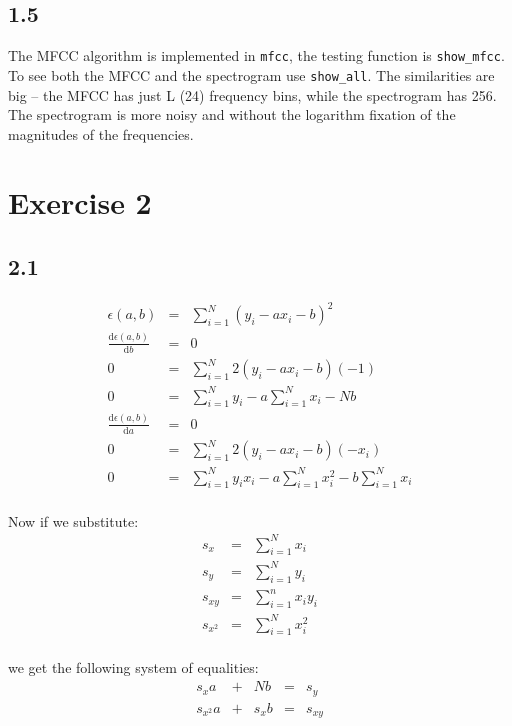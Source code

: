 \documentclass[a4paper]{article}
\def\d{\mathrm{d}}
\begin{document}
\subsection*{1.5}

The MFCC algorithm is implemented in \texttt{mfcc}, the testing function is
\texttt{show\_mfcc}. To see both the MFCC and the spectrogram use
\texttt{show\_all}. The similarities are big -- the MFCC has just L (24)
frequency bins, while the spectrogram has 256. The spectrogram is more noisy and
without the logarithm fixation of the magnitudes of the frequencies.

\section*{Exercise 2}

\subsection*{2.1}

\begin{eqnarray*}
\epsilon(a,b) &=& \sum_{i = 1}^{N} (y_i - ax_i - b)^2 \\
\frac{\d\epsilon(a, b)}{\d b} &=& 0 \\
0 &=& \sum_{i = 1}^{N} 2(y_i - ax_i - b)(-1) \\
0 &=& \sum_{i = 1}^{N} y_i - a\sum_{i = 1}^{N} x_i - Nb \\
\frac{\d\epsilon(a, b)}{\d a} &=& 0 \\
0 &=& \sum_{i = 1}^{N} 2(y_i - ax_i - b)(-x_i) \\
0 &=& \sum_{i = 1}^{N} y_ix_i - a\sum_{i = 1}^{N} x_i^2 - b\sum_{i=1}^{N} x_i \\
\end{eqnarray*}

Now if we substitute:
\begin{eqnarray*}
s_x &=& \sum_{i = 1}^{N} x_i \\
s_y &=& \sum_{i = 1}^{N} y_i \\
s_{xy} &=& \sum_{i = 1}^{n} x_iy_i \\
s_{x^2} &=& \sum_{i = 1}^{N} x_i^2 \\
\end{eqnarray*}

we get the following system of equalities:
\[
\begin{array}{|ccccc}
  s_x a &+& Nb &=& s_y \\
  s_{x^2} a &+& s_xb &=& s_{xy} \\
\end{array}
\]
\end{document}
